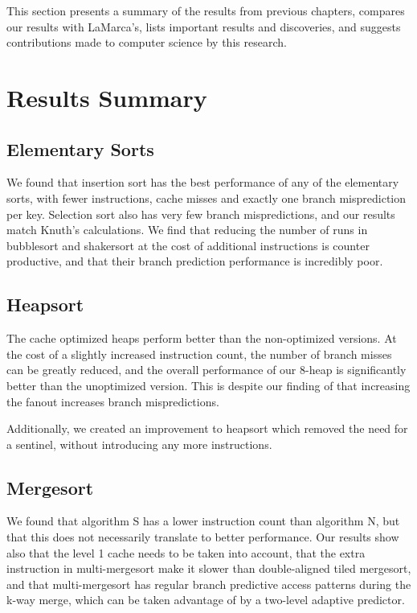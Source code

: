 \label{conclusions}
This section presents a summary of the results from previous chapters, compares
our results with LaMarca's, lists important results and discoveries, and
suggests contributions made to computer science by this research.

\section{Results Summary}

\subsection{Elementary Sorts}

We found that insertion sort has the best performance of any of the elementary
sorts, with fewer instructions, cache misses and exactly one branch
misprediction per key. Selection sort also has very few branch mispredictions,
and our results match Knuth's calculations. We find that reducing the number of
runs in bubblesort and shakersort at the cost of additional instructions is
counter productive, and that their branch prediction performance is incredibly
poor.

\subsection{Heapsort}

The cache optimized heaps perform better than the non-optimized versions. At the
cost of a slightly increased instruction count, the number of branch misses can
be greatly reduced, and the overall performance of our 8-heap is significantly
better than the unoptimized version. This is despite our finding of that
increasing the fanout increases branch mispredictions.

Additionally, we created an improvement to heapsort which removed the need for a
sentinel, without introducing any more instructions.

\subsection{Mergesort}

We found that algorithm S has a lower instruction count than algorithm N, but
that this does not necessarily translate to better performance. Our results show
also that the level 1 cache needs to be taken into account, that the extra
instruction in multi-mergesort make it slower than double-aligned tiled
mergesort, and that multi-mergesort has regular branch predictive access
patterns during the k-way merge, which can be taken advantage of by a two-level
adaptive predictor.


